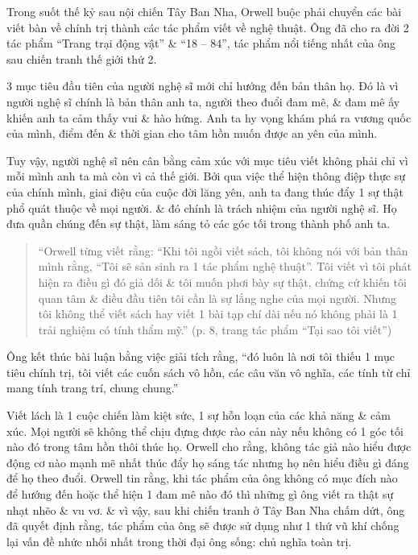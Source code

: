 \documentclass[oneside]{book}
\numberwithin{equation}{section}
\begin{document}
Trong suốt thế kỷ sau nội chiến Tây Ban Nha, Orwell buộc phải chuyển các bài viết bàn về chính trị thành các tác phẩm viết về nghệ thuật. Ông đã cho ra đời 2 tác phẩm ``Trang trại động vật'' \& ``18 -- 84'', tác phẩm nổi tiếng nhất của ông sau chiến tranh thế giới thứ 2.

3 mục tiêu đầu tiên của người nghệ sĩ mới chỉ hướng đến bản thân họ. Đó là vì người nghệ sĩ chính là bản thân anh ta, người theo đuổi đam mê, \& đam mê ấy khiến anh ta cảm thấy vui \& hào hứng. Anh ta hy vọng khám phá ra vương quốc của mình, điểm đến \& thời gian cho tâm hồn muốn được an yên của mình.

Tuy vậy, người nghệ sĩ nên cân bằng cảm xúc với mục tiêu viết không phải chỉ vì mỗi mình anh ta mà còn vì cả thế giới. Bởi qua việc thể hiện thông điệp thực sự của chính mình, giai điệu của cuộc đời lăng yên, anh ta đang thúc đẩy 1 sự thật phổ quát thuộc về mọi người. \& đó chính là trách nhiệm của người nghệ sĩ. Họ đưa quần chúng đến sự thật, làm sáng tỏ các góc tối trong thành phố anh ta.

\begin{quotation}
	``Orwell từng viết rằng: ``Khi tôi ngồi viết sách, tôi không nói với bản thân mình rằng, ``Tôi sẽ sản sinh ra 1 tác phẩm nghệ thuật''. Tôi viết vì tôi phát hiện ra điều gì đó giả dối \& tôi muốn phơi bày sự thật, chứng cứ khiến tôi quan tâm \& điều đầu tiên tôi cần là sự lắng nghe của mọi người. Nhưng tôi không thể viết sách hay viết 1 bài tạp chí dài nếu nó không phải là 1 trải nghiệm có tính thẩm mỹ.'' (p. 8, trang tác phẩm ``Tại sao tôi viết'')
\end{quotation}
Ông kết thúc bài luận bằng việc giải tích rằng, ``đó luôn là nơi tôi thiếu 1 mục tiêu chính trị, tôi viết các cuốn sách vô hồn, các câu văn vô nghĩa, các tính từ chỉ mang tính trang trí, chung chung.''

Viết lách là 1 cuộc chiến làm kiệt sức, 1  sự hỗn loạn của các khả năng \& cảm xúc. Mọi người sẽ không thể chịu đựng được rào cản này nếu không có 1 góc tối nào đó trong tâm hồn thôi thúc họ. Orwell cho rằng, không tác giả nào hiểu được động cơ nào mạnh mẽ nhất thúc đẩy họ sáng tác nhưng họ nên hiểu điều gì đáng để họ theo đuổi. Orwell tin rằng, khi tác phẩm của ông không có mục đích nào để hướng đến hoặc thể hiện 1 đam mê nào đó thì những gì ông viết ra thật sự nhạt nhẽo \& vu vơ. \& vì vậy, sau khi chiến tranh ở Tây Ban Nha chấm dứt, ông đã quyết định rằng, tác phẩm của ông sẽ được sử dụng như 1 thứ vũ khí chống lại vấn đề nhức nhối nhất trong thời đại ông sống: chủ nghĩa toàn trị.
\end{document}
